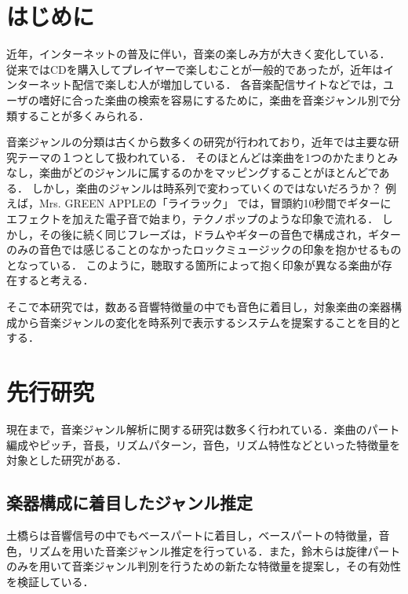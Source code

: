 \section{はじめに}

近年，インターネットの普及に伴い，音楽の楽しみ方が大きく変化している．
従来ではCDを購入してプレイヤーで楽しむことが一般的であったが，近年はインターネット配信で楽しむ人が増加している．
各音楽配信サイトなどでは，ユーザの嗜好に合った楽曲の検索を容易にするために，楽曲を音楽ジャンル別で分類することが多くみられる．

音楽ジャンルの分類は古くから数多くの研究が行われており，近年では主要な研究テーマの１つとして扱われている．
そのほとんどは楽曲を1つのかたまりとみなし，楽曲がどのジャンルに属するのかをマッピングすることがほとんどである．
しかし，楽曲のジャンルは時系列で変わっていくのではないだろうか？
%
例えば，Mrs. GREEN APPLEの「ライラック」\cite{lilac}%
では，冒頭約10秒間でギターにエフェクトを加えた電子音で始まり，テクノポップのような印象で流れる．
しかし，その後に続く同じフレーズは，ドラムやギターの音色で構成され，ギターのみの音色では感じることのなかったロックミュージックの印象を抱かせるものとなっている．
このように，聴取する箇所によって抱く印象が異なる楽曲が存在すると考える．


そこで本研究では，数ある音響特徴量の中でも音色に着目し，対象楽曲の楽器構成から音楽ジャンルの変化を時系列で表示するシステムを提案することを目的とする．



\section{先行研究}
現在まで，音楽ジャンル解析に関する研究は数多く行われている．楽曲のパート編成やピッチ，音長，リズムパターン，音色，リズム特性などといった特徴量を対象とした研究がある\cite{niduma}\cite{percino}．


\subsection{楽器構成に着目したジャンル推定}


土橋ら\cite{bassline}は音響信号の中でもベースパートに着目し，ベースパートの特徴量，音色，リズムを用いた音楽ジャンル推定を行っている．また，鈴木ら\cite{suzuki}は旋律パートのみを用いて音楽ジャンル判別を行うための新たな特徴量を提案し，その有効性を検証している．

